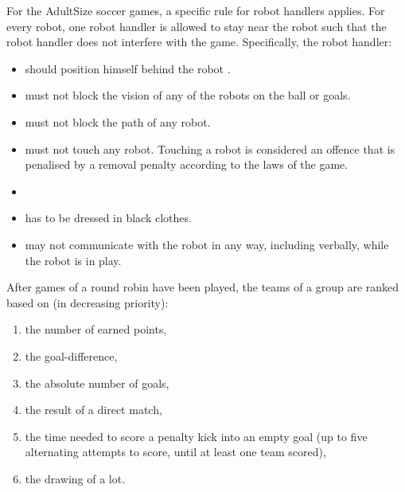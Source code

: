 \bigskip

For the AdultSize soccer games, a specific rule for robot handlers applies. For every robot, one robot handler is allowed to stay near the robot such that the robot handler does not interfere with the game. Specifically, the robot handler:
\begin{itemize}
\item should position himself behind the robot  .
\item must not block the vision of any of the robots on the ball or goals.
\item must not block the path of any robot.
\item must not touch any robot. Touching a robot is considered an offence that is penalised by a removal penalty according to the laws of the game.
\item {}
\item has to be dressed in black clothes.
\item may not communicate with the robot in any way, including verbally, while the robot is in play.
\end{itemize}
\color{black}

\bigskip

After games of a round robin have been played, the teams of a group are ranked based on (in decreasing priority): 

\begin{enumerate}
\item the number of earned points,
\item the goal-difference,
\item the absolute number of goals,
\item the result of a direct match,
\item the time needed to score a penalty kick into an empty goal (up to five alternating attempts to score, until at least one team scored),
\item the drawing of a lot.
\end{enumerate}

\bigskip

